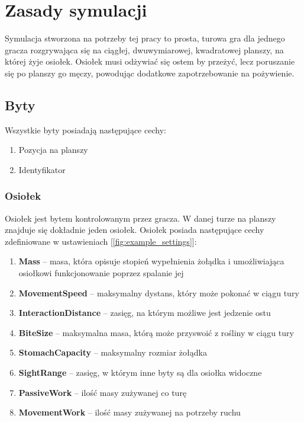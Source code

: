 \chapter{Zasady symulacji}
Symulacja stworzona na potrzeby tej pracy to prosta, turowa gra dla jednego gracza rozgrywająca się na ciągłej, dwuwymiarowej, kwadratowej planszy, na której żyje osiołek. Osiołek musi odżywiać się ostem by przeżyć, lecz poruszanie się po planszy go męczy, powodując dodatkowe zapotrzebowanie na pożywienie.

\section{Byty}
Wszystkie byty posiadają następujące cechy:
\begin{enumerate}    
    \item Pozycja na planszy
    \item Identyfikator
\end{enumerate}

\subsection{Osiołek}
Osiołek jest bytem kontrolowanym przez gracza. W danej turze na planszy znajduje się dokładnie jeden osiołek. Osiołek posiada następujące cechy zdefiniowane w ustawieniach [\ref{fig:example_settings}]:
\begin{enumerate}    
    \item \textbf{Mass} -- masa, która opisuje stopień wypełnienia żołądka i umożliwiająca osiołkowi funkcjonowanie poprzez spalanie jej
    \item \textbf{MovementSpeed} -- maksymalny dystans, który może pokonać w ciągu tury
    \item \textbf{InteractionDistance} -- zasięg, na którym możliwe jest jedzenie ostu
    \item \textbf{BiteSize} -- maksymalna masa, którą może przyswoić z rośliny w ciągu tury
    \item \textbf{StomachCapacity} -- maksymalny rozmiar żołądka
    \item \textbf{SightRange} -- zasięg, w którym inne byty są dla osiołka widoczne
    \item \textbf{PassiveWork} -- ilość masy zużywanej co turę
    \item \textbf{MovementWork} -- ilość masy zużywanej na potrzeby ruchu 
\end{enumerate}

